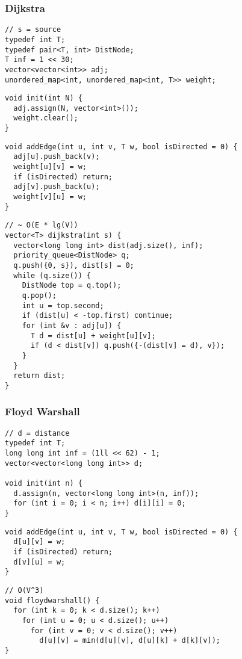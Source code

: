 \documentclass[twoside]{article}
\begin{document}
\begin{multicols*}{2}
\subsubsection*{Dijkstra}
\begin{verbatim}
// s = source
typedef int T;
typedef pair<T, int> DistNode;
T inf = 1 << 30;
vector<vector<int>> adj;
unordered_map<int, unordered_map<int, T>> weight;
\end{verbatim}
\vspace{-12pt}
\begin{verbatim}
void init(int N) {
  adj.assign(N, vector<int>());
  weight.clear();
}
\end{verbatim}
\vspace{-12pt}
\begin{verbatim}
void addEdge(int u, int v, T w, bool isDirected = 0) {
  adj[u].push_back(v);
  weight[u][v] = w;
  if (isDirected) return;
  adj[v].push_back(u);
  weight[v][u] = w;
}
\end{verbatim}
\vspace{-12pt}
\begin{verbatim}
// ~ O(E * lg(V))
vector<T> dijkstra(int s) {
  vector<long long int> dist(adj.size(), inf);
  priority_queue<DistNode> q;
  q.push({0, s}), dist[s] = 0;
  while (q.size()) {
    DistNode top = q.top();
    q.pop();
    int u = top.second;
    if (dist[u] < -top.first) continue;
    for (int &v : adj[u]) {
      T d = dist[u] + weight[u][v];
      if (d < dist[v]) q.push({-(dist[v] = d), v});
    }
  }
  return dist;
}
\end{verbatim}

\subsubsectionfont{\large\bfseries\sffamily\underline}
\subsubsection*{Floyd Warshall}
\begin{verbatim}
// d = distance
typedef int T;
long long int inf = (1ll << 62) - 1;
vector<vector<long long int>> d;

void init(int n) {
  d.assign(n, vector<long long int>(n, inf));
  for (int i = 0; i < n; i++) d[i][i] = 0;
}
\end{verbatim}
\vspace{-12pt}
\begin{verbatim}
void addEdge(int u, int v, T w, bool isDirected = 0) {
  d[u][v] = w;
  if (isDirected) return;
  d[v][u] = w;
}
\end{verbatim}
\vspace{-12pt}
\begin{verbatim}
// O(V^3)
void floydwarshall() {
  for (int k = 0; k < d.size(); k++)
    for (int u = 0; u < d.size(); u++)
      for (int v = 0; v < d.size(); v++)
        d[u][v] = min(d[u][v], d[u][k] + d[k][v]);
}
\end{verbatim}


\end{multicols*}
\end{document}
